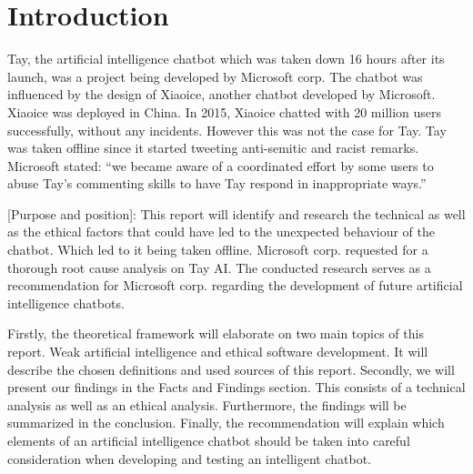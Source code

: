 \chapter{Introduction}

Tay, the artificial intelligence chatbot which was taken down 16 hours after its launch, was a project being developed by Microsoft corp. The chatbot was influenced by the design of Xiaoice, another chatbot developed by Microsoft. Xiaoice was deployed in China. In 2015, Xiaoice chatted with 20 million users successfully, without any incidents\cite{nytimes}. However this was not the case for Tay. Tay was taken offline since it started tweeting anti-semitic and racist remarks. Microsoft stated: “we became aware of a coordinated effort by some users to abuse Tay’s commenting skills to have Tay respond in inappropriate ways.”\cite{microsoftstatement}

[Purpose and position]: This report will identify and research the technical as well as the ethical factors that could have led to the unexpected behaviour of the chatbot. Which led to it being taken offline. Microsoft corp. requested for a thorough root cause analysis on Tay AI. The conducted research serves as a recommendation for Microsoft corp. regarding the development of future artificial intelligence chatbots.

Firstly, the theoretical framework will elaborate on two main topics of this report. Weak artificial intelligence and ethical software development. It will describe the chosen definitions and used sources of this report. Secondly, we will present our findings in the Facts and Findings section. This consists of a technical analysis as well as an ethical analysis. Furthermore, the findings will be summarized in the conclusion. Finally, the recommendation will explain which elements of an artificial intelligence chatbot should be taken into careful consideration when developing and testing an intelligent chatbot.

